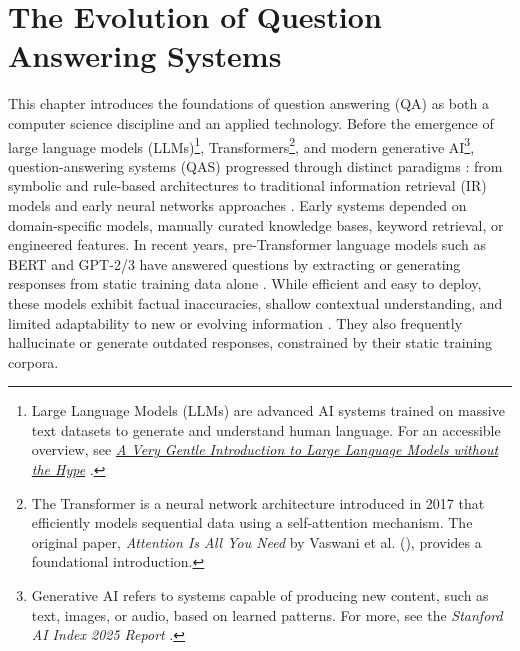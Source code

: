 \chapter{The Evolution of Question Answering Systems}
\label{chap:QAS}
\sloppy
\begin{spacing}{1.5}
\setcounter{table}{0}
This chapter introduces the foundations of question answering (QA) as both a computer science discipline and an applied technology. Before the emergence of large language models (LLMs)\footnote{Large Language Models (LLMs) are advanced AI systems trained on massive text datasets to generate and understand human language. For an accessible overview, see \href{https://mark-riedl.medium.com/a-very-gentle-introduction-to-large-language-models-without-the-hype-5f67941fa59e}{\textit{A Very Gentle Introduction to Large Language Models without the Hype}} \citep{riedl_very_2023}.}, Transformers\footnote{The Transformer is a neural network architecture introduced in 2017 that efficiently models sequential data using a self-attention mechanism. The original paper, \textit{Attention Is All You Need} by Vaswani et al. (\citeyear{vaswani_attention_2017}), provides a foundational introduction.}, and modern generative AI\footnote{Generative AI refers to systems capable of producing new content, such as text, images, or audio, based on learned patterns. For more, see the \textit{Stanford AI Index 2025 Report} \citep{maslej_artificial_2025}.}, question-answering systems (QAS) progressed through distinct paradigms : from symbolic and rule-based architectures to traditional information retrieval (IR) models and early neural networks approaches \citep{jurafsky_chapter_2024,antoniou_survey_2022}. Early systems depended on domain-specific models, manually curated knowledge bases, keyword retrieval, or engineered features. In recent years, pre-Transformer language models such as BERT and GPT-2/3 have answered questions by extracting or generating responses from static training data alone \citep{caballero_brief_2021}. While efficient and easy to deploy, these models exhibit factual inaccuracies, shallow contextual understanding, and limited adaptability to new or evolving information \citep{alanazi_question_2021}. They also frequently hallucinate or generate outdated responses, constrained by their static training corpora.


\end{spacing}
